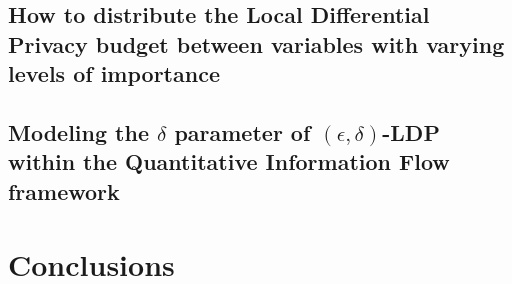 \documentclass[conference]{IEEEtran}
\begin{document}
\subsection{How to distribute the Local Differential Privacy budget between variables with varying levels of importance}\label{subsec:ldpbudget}

\subsection{Modeling the $\delta$ parameter of $(\epsilon,\delta)$-LDP within the Quantitative Information Flow framework}\label{subsec:ldeltap}

\section{Conclusions}




\end{document}
